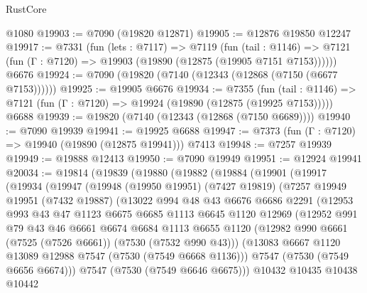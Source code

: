 \begin{lexlean}{RustCore}
\begin{coremodule}
    @1080
@19903 := @7090 (@19820 @12871)
@19905 := @12876 @19850 @12247
@19917 := @7331
    (fun (lets : @7117) =>
    @7119
      (fun (tail : @1146) =>
      @7121 (fun (Γ : @7120) => @19903 (@19890 (@12875 (@19905 @7151 @7153))))))
    @6676
@19924 := @7090 (@19820 (@7140 (@12343 (@12868 (@7150 (@6677 @7153))))))
@19925 := @19905 @6676
@19934 := @7355
    (fun (tail : @1146) => @7121 (fun (Γ : @7120) => @19924 (@19890 (@12875 (@19925 @7153)))))
    @6688
@19939 := @19820 (@7140 (@12343 (@12868 (@7150 @6689))))
@19940 := @7090 @19939
@19941 := @19925 @6688
@19947 := @7373 (fun (Γ : @7120) => @19940 (@19890 (@12875 @19941))) @7413
@19948 := @7257 @19939
@19949 := @19888 @12413
@19950 := @7090 @19949
@19951 := @12924 @19941
@20034 := @19814
    (@19839
      (@19880
        (@19882
          (@19884
            (@19901
              (@19917
                (@19934
                  (@19947
                    (@19948
                      (@19950 @19951)
                      (@7427 @19819)
                      (@7257
                        @19949
                        @19951
                        (@7432 @19887)
                        (@13022
                          @994
                          @48
                          @43
                          @6676
                          @6686
                          @2291
                          (@12953
                            @993
                            @43
                            @47
                            @1123
                            @6675
                            @6685
                            @1113
                            @6645
                            @1120
                            @12969
                            (@12952
                              @991
                              @79
                              @43
                              @46
                              @6661
                              @6674
                              @6684
                              @1113
                              @6655
                              @1120
                              (@12982 @990 @6661 (@7525 (@7526 @6661)) (@7530 (@7532 @990 @43)))
                              (@13083 @6667 @1120 @13089 @12988 @7547 (@7530 (@7549 @6668 @1136)))
                              @7547
                              (@7530 (@7549 @6656 @6674)))
                            @7547
                            (@7530 (@7549 @6646 @6675)))
                          @10432
                          @10435
                          @10438
                          @10442

\end{coremodule}
\end{lexlean}
